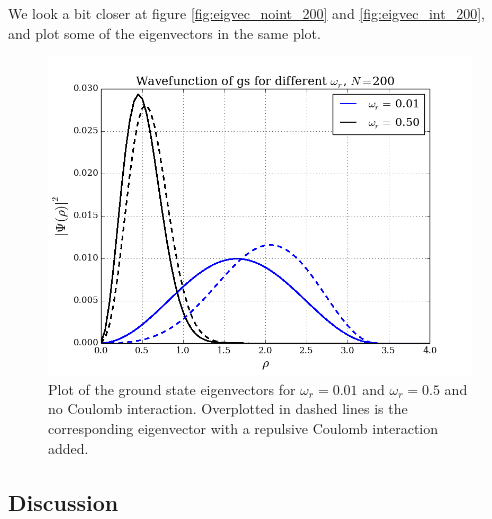 \documentclass{article}
\begin{document}
We look a bit closer at figure \ref{fig:eigvec_noint_200} and \ref{fig:eigvec_int_200}, and plot some of the eigenvectors in the same plot.
\begin{figure}[H]
  \centering
  \includegraphics[scale=0.5]{../figures/eigvec_compare_n200.png}
  \caption{Plot of the ground state eigenvectors for $\omega_r = 0.01$ and $\omega_r = 0.5$ and no Coulomb interaction. Overplotted in dashed lines is the corresponding eigenvector with a repulsive Coulomb interaction added.}
  \label{fig:eigvec_compare}
\end{figure}
\subsection{Discussion}
\end{document}

